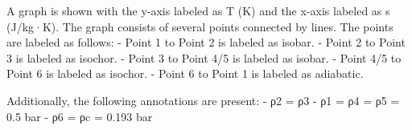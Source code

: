 A graph is shown with the y-axis labeled as T (K) and the x-axis labeled as s (J/kg·K). The graph consists of several points connected by lines. The points are labeled as follows:
- Point 1 to Point 2 is labeled as isobar.
- Point 2 to Point 3 is labeled as isochor.
- Point 3 to Point 4/5 is labeled as isobar.
- Point 4/5 to Point 6 is labeled as isochor.
- Point 6 to Point 1 is labeled as adiabatic.

Additionally, the following annotations are present:
- ρ2 = ρ3
- ρ1 = ρ4 = ρ5 = 0.5 bar
- ρ6 = ρc = 0.193 bar